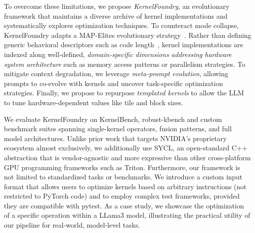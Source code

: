 To overcome these limitations, we propose \textit{KernelFoundry}, an evolutionary framework that maintains a diverse archive of kernel implementations and systematically explores optimization techniques. 
To counteract mode collapse, KernelFoundry adapts a MAP-Elites evolutionary strategy~\citep{mouret2015illuminating}. Rather than defining generic behavioral descriptors such as code length~\citep{lehman2023evolution}, kernel implementations are indexed along well‑defined, \textit{domain‑specific dimensions addressing hardware system architecture} such as memory access patterns or parallelism strategies. 
To mitigate context degradation, we leverage \textit{meta‑prompt evolution}, allowing prompts to co-evolve with kernels and uncover task-specific optimization strategies. 
Finally, we propose to repurpose\textit{ templated kernels} to allow the LLM to tune hardware-dependent values like tile and block sizes.


We evaluate KernelFoundry on KernelBench, robust-kbench and custom benchmark suites spanning single-kernel operators, fusion patterns, and full model architectures. 
Unlike prior work that targets NVIDIA's proprietary ecosystem almost exclusively, we additionally use SYCL, an open-standard C++ abstraction that is vendor-agnostic and more expressive than other cross-platform GPU programming frameworks such as Triton. 
Furthermore, our framework is not limited to standardized tasks or benchmarks. We introduce a custom input format that allows users to optimize kernels based on arbitrary instructions (not restricted to PyTorch code) and to employ complex test frameworks, provided they are compatible with pytest. As a case study, we showcase the optimization of a specific operation within a LLama3 model, illustrating the practical utility of our pipeline for real-world, model-level tasks.

